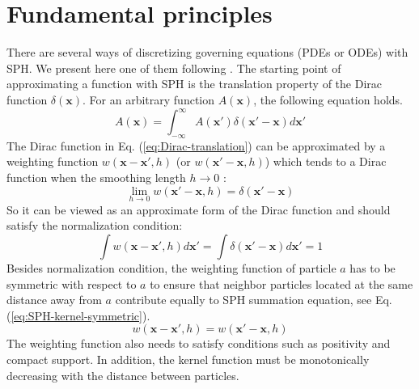 \section{Fundamental principles}
There are several ways  of discretizing governing equations (PDEs or ODEs) with SPH. We present here one of them following \citet{monaghan1992smoothed, monaghan2005smoothed, monaghan2012smoothed}. The starting point of approximating a function with SPH is the translation property of the Dirac function $\delta(\textbf{x})$. For an arbitrary function $A(\textbf{x})$, the following equation holds. 
\begin{equation}
A\left(\textbf{x}\right)=\int_{-\infty}^{\infty} A\left(\textbf{x} \prime\right) \delta \left(\textbf{x} \prime - \textbf{x}\right) d\textbf{x} \prime
\label{eq:Dirac-translation}
\end{equation}
The Dirac function in Eq. (\ref{eq:Dirac-translation}) can be approximated by a weighting function $w\left(\textbf{x}-\textbf{x}\prime, h\right)$ (or $w\left(\textbf{x}\prime-\textbf{x}, h\right)$) which tends to a Dirac function when the smoothing length $h \rightarrow 0$ :
\begin{equation}
\lim _{h \rightarrow 0} w\left(\textbf{x} \prime-\textbf{x}, h\right) =  \delta \left(\textbf{x} \prime - \textbf{x}\right)
\label{eq:SPH_kernel_delta}
\end{equation}
So it can be viewed as an approximate form of the Dirac function and should satisfy the normalization condition:
\begin{equation}
\int	 w\left(\textbf{x}-\textbf{x}\prime, h\right) d\textbf{x}\prime = \int	 \delta \left(\textbf{x} \prime - \textbf{x}\right) d\textbf{x} \prime =1
\label{eq:SPH-kernel-normalization-prop}
\end{equation}
Besides normalization condition, the weighting function of particle $a$ has to be symmetric with respect to $a$ to ensure that neighbor particles located at the same distance away from $a$ contribute equally to SPH summation equation, see Eq. (\ref{eq:SPH-kernel-symmetric}).
\begin{equation}
w\left(\textbf{x}- \textbf{x} \prime, h\right) = w\left(\textbf{x} \prime - \textbf{x}, h\right)
\label{eq:SPH-kernel-symmetric}
\end{equation}
The weighting function also needs to satisfy conditions such as positivity and compact support. In addition, the kernel function must be monotonically decreasing with the distance between particles.

